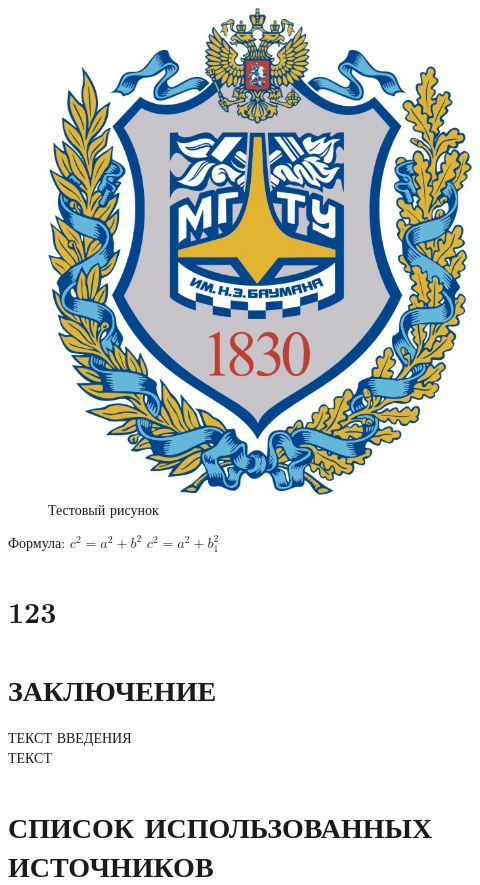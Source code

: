 \documentclass[12pt, left=30mm, right=10mm, top=20mm, bottom=20mm]{templateReportBMSTU}
\begin{document}
	\begin{figure}[h]
		\centering
		\includegraphics[width=0.5\linewidth]{1.png}
		\caption{Тестовый рисунок}
		\label{fig:mpr}
	\end{figure}
	
	Формула: $c^{2}=a^{2}+b^{2}$
	\begin{math}
		c^2 = a^2 + b_1^2
	\end{math}
		\pagebreak
	
	\section{123}

	\section*{ЗАКЛЮЧЕНИЕ}
		ТЕКСТ ВВЕДЕНИЯ
		\\ ТЕКСТ
		\pagebreak

	\section*{СПИСОК ИСПОЛЬЗОВАННЫХ ИСТОЧНИКОВ}

		\pagebreak
\end{document}
